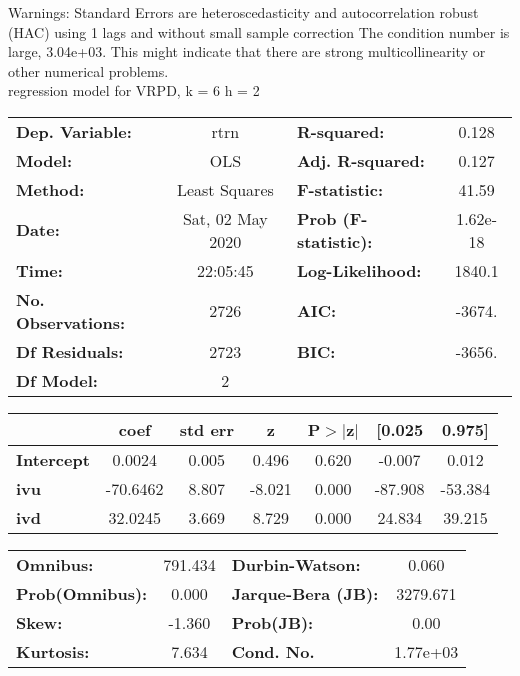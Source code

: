 Warnings: \newline
 [1] Standard Errors are heteroscedasticity and autocorrelation robust (HAC) using 1 lags and without small sample correction \newline
 [2] The condition number is large, 3.04e+03. This might indicate that there are \newline
 strong multicollinearity or other numerical problems.\\ 

regression model for VRPD, k = 6 h = 2\begin{center}
\begin{tabular}{lclc}
\toprule
\textbf{Dep. Variable:}    &       rtrn       & \textbf{  R-squared:         } &     0.128   \\
\textbf{Model:}            &       OLS        & \textbf{  Adj. R-squared:    } &     0.127   \\
\textbf{Method:}           &  Least Squares   & \textbf{  F-statistic:       } &     41.59   \\
\textbf{Date:}             & Sat, 02 May 2020 & \textbf{  Prob (F-statistic):} &  1.62e-18   \\
\textbf{Time:}             &     22:05:45     & \textbf{  Log-Likelihood:    } &    1840.1   \\
\textbf{No. Observations:} &        2726      & \textbf{  AIC:               } &    -3674.   \\
\textbf{Df Residuals:}     &        2723      & \textbf{  BIC:               } &    -3656.   \\
\textbf{Df Model:}         &           2      & \textbf{                     } &             \\
\bottomrule
\end{tabular}
\begin{tabular}{lcccccc}
                   & \textbf{coef} & \textbf{std err} & \textbf{z} & \textbf{P$> |$z$|$} & \textbf{[0.025} & \textbf{0.975]}  \\
\midrule
\textbf{Intercept} &       0.0024  &        0.005     &     0.496  &         0.620        &       -0.007    &        0.012     \\
\textbf{ivu}       &     -70.6462  &        8.807     &    -8.021  &         0.000        &      -87.908    &      -53.384     \\
\textbf{ivd}       &      32.0245  &        3.669     &     8.729  &         0.000        &       24.834    &       39.215     \\
\bottomrule
\end{tabular}
\begin{tabular}{lclc}
\textbf{Omnibus:}       & 791.434 & \textbf{  Durbin-Watson:     } &    0.060  \\
\textbf{Prob(Omnibus):} &   0.000 & \textbf{  Jarque-Bera (JB):  } & 3279.671  \\
\textbf{Skew:}          &  -1.360 & \textbf{  Prob(JB):          } &     0.00  \\
\textbf{Kurtosis:}      &   7.634 & \textbf{  Cond. No.          } & 1.77e+03  \\
\bottomrule
\end{tabular}
\end{center}

